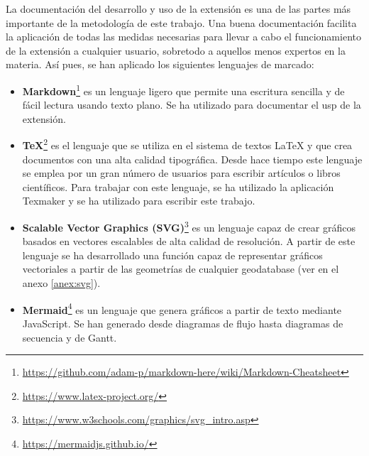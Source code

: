La documentación del desarrollo y uso de la extensión es una de las partes más importante de la metodología de este trabajo. Una buena documentación facilita la aplicación de todas las medidas necesarias para llevar a cabo el funcionamiento de la extensión a cualquier usuario, sobretodo a aquellos menos expertos en la materia. Así pues, se han aplicado los siguientes lenguajes de marcado:

\begin{itemize}
\item\textbf{Markdown}\footnote{\url{https://github.com/adam-p/markdown-here/wiki/Markdown-Cheatsheet}} es un lenguaje ligero que permite una escritura sencilla y de fácil lectura usando texto plano. Se ha utilizado para documentar el usp de la extensión.
\item\textbf{TeX}\footnote{\url{https://www.latex-project.org/}} es el lenguaje que se utiliza en el sistema de textos LaTeX y que crea documentos con una alta calidad tipográfica. Desde hace tiempo este lenguaje se emplea por un gran número de usuarios para escribir artículos o libros científicos. Para trabajar con este lenguaje, se ha utilizado la aplicación Texmaker y se ha utilizado para escribir este trabajo.
\item\textbf{Scalable Vector Graphics (SVG)}\footnote{\url{https://www.w3schools.com/graphics/svg_intro.asp}} es un lenguaje capaz de crear gráficos basados en vectores escalables de alta calidad de resolución. A partir de este lenguaje se ha desarrollado una función capaz de representar gráficos vectoriales a partir de las geometrías de cualquier geodatabase (ver en el anexo \ref{anex:svg}).
\item\textbf{Mermaid}\footnote{\url{https://mermaidjs.github.io/}} es un lenguaje que genera gráficos a partir de texto mediante JavaScript. Se han generado desde diagramas de flujo hasta diagramas de secuencia y de Gantt.
\end{itemize}
